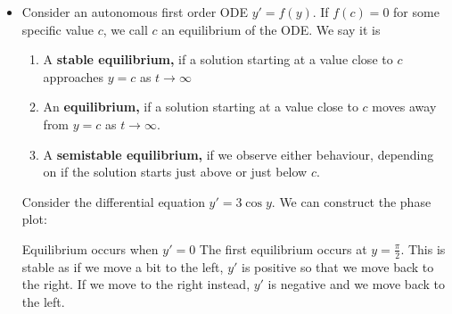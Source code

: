 \begin{itemize}
\begin{center}
          \end{center}
    \item Consider an autonomous first order ODE $y'=f(y)$. If $f(c)=0$ for some specific value $c$, we call $c$ an equilibrium of the ODE. We say it is
          \begin{enumerate}
              \item A \textbf{stable equilibrium,} if a solution starting at a value close to $c$ approaches $y=c$ as $t\rightarrow\infty$
              \item An \textbf{equilibrium,} if a solution starting at a value close to $c$ moves away from $y=c$ as $t\rightarrow\infty$.
              \item A \textbf{semistable equilibrium,} if we observe either behaviour, depending on if the solution starts just above or just below $c$.
          \end{enumerate}
          \begin{example}
              Consider the differential equation $y'=3\cos y$. We can construct the phase plot:
              \begin{center}
              \end{center}
              Equilibrium occurs when $y'=0$ The first equilibrium occurs at $y=\frac{\pi}{2}$. This is stable as if we move a bit to the left, $y'$ is positive so that we move back to the right. If we move to the right instead, $y'$ is negative and we move back to the left.
              \vspace{2mm}


\end{example}
\end{itemize}
